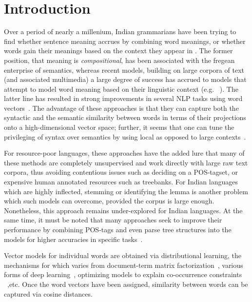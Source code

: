 \chapter{Introduction}
Over a period of nearly a millenium, Indian grammarians have been trying to find whether sentence meaning accrues by combining word meanings, or whether words gain their meanings based on the context they appear in \cite{Matilal:90}.  The former position, that meaning is {\em compositional}, has been associated with the fregean
enterprise of semantics, whereas recent models, building on large corpora of
text (and associated multimedia) a large degree of success has accrued to
models that attempt to model word meaning based on their linguistic context
(e.g. ~\cite{Landauer:97}).  The latter line has resulted in strong improvements in several NLP tasks using word vectors~\cite{Collobert:08,Turian:10,Mikolov:13a,Socher:13}. 
The advantage of these approaches is that they can capture both the syntactic
and the semantic similarity between words in terms of their projections onto
a high-dimensional vector space; further, it seems that one can tune the
privileging of syntax over semantics by using local as opposed to large contexts~\cite{Huang:12}. 

For resource-poor languages, these approaches have the added lure
that many of these methods are completely unsupervised and work directly with
large raw text corpora, thus
avoiding contentious issues such as deciding on a POS-tagset, or expensive
human annotated resources such as treebanks.  For Indian languages which are
highly inflected, stemming or identifying the lemma is another problem
which such models can overcome, provided the corpus is large enough.
Nonetheless, this approach remains under-explored for Indian languages.
At the same time, it must 
be noted that many approaches seek to improve their performance
by combining POS-tags and even parse tree structures
into the models for higher accuracies in specific tasks~\cite{Socher:13}. 

Vector models for individual words are obtained via distributional learning, the
mechanisms for which varies from document-term
matrix factorization~\cite{Landauer:97},
various forms of deep learning~\cite{Collobert:08,Turian:10,Socher:13}, 
optimizing models to explain co-occurrence constraints
~\cite{Mikolov:13a,Pennington:14},etc. Once the word vectors have been assigned, similarity between words can
be captured via cosine distances. 

